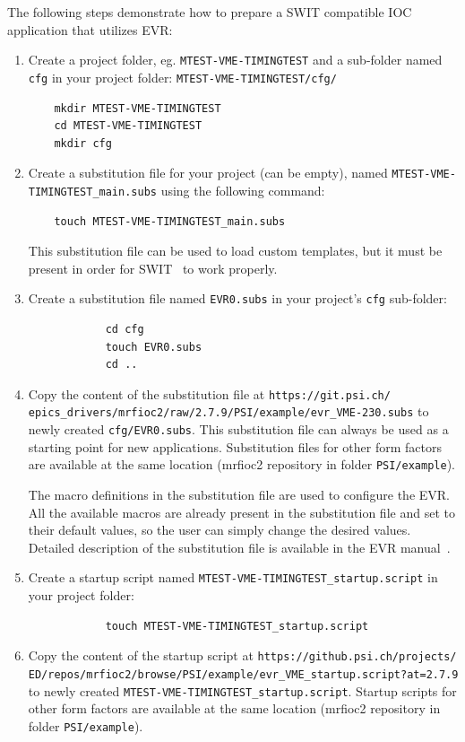 \documentclass[12pt,a4paper]{article}
\newcommand{\latestDriverVersion}{2.7.9}
\begin{document}
The following steps demonstrate how to prepare a SWIT compatible IOC application that utilizes EVR:
\begin{enumerate}

	\item Create a project folder, eg. \texttt{MTEST-VME-TIMINGTEST} and a sub-folder named \texttt{cfg} in your project folder: \texttt{MTEST-VME-TIMINGTEST/cfg/}
\begin{verbatim}
	mkdir MTEST-VME-TIMINGTEST
	cd MTEST-VME-TIMINGTEST
	mkdir cfg
\end{verbatim}

	\item Create a substitution file for your project (can be empty), named \texttt{MTEST-VME-TIMINGTEST\_main.subs} using the following command: 
\begin{verbatim}
	touch MTEST-VME-TIMINGTEST_main.subs
\end{verbatim}	
	This substitution file can be used to load custom templates, but it must be present in order for SWIT~\cite{swit} to work properly.
	
	\item 
		Create a substitution file named \texttt{EVR0.subs} in your project's \texttt{cfg} sub-folder:
		\begin{verbatim}
			cd cfg
			touch EVR0.subs
			cd ..
		\end{verbatim}
	\item \label{quickstart:copySubs} Copy the content of the substitution file  at \texttt{https://git.psi.ch/} \texttt{epics\_drivers/mrfioc2/raw/\latestDriverVersion/PSI/example/evr\_VME-230.subs} to newly created \texttt{cfg/EVR0.subs}. This substitution file can always be used as a starting point for new applications. Substitution files for other form factors are available at the same location (mrfioc2 repository in folder \texttt{PSI/example}).
	
	The macro definitions in the substitution file are used to configure the EVR. All the available macros are already present in the substitution file and set to their default values, so the user can simply change the desired values. Detailed description of the substitution file is available in the EVR manual~\cite{evr_manual}.

	\item
		Create a startup script named \texttt{MTEST-VME-TIMINGTEST\_startup.script} in your project folder:
		\begin{verbatim}
			touch MTEST-VME-TIMINGTEST_startup.script
		\end{verbatim}
	\item 
		Copy the content of the startup script at \texttt{https://github.psi.ch/projects/} \texttt{ED/repos/mrfioc2/browse/PSI/example/evr\_VME\_startup.script?at=\latestDriverVersion} to newly created \texttt{MTEST-VME-TIMINGTEST\_startup.script}. Startup scripts for other form factors are available at the same location (mrfioc2 repository in folder \texttt{PSI/example}).


\end{enumerate}
\end{document}
